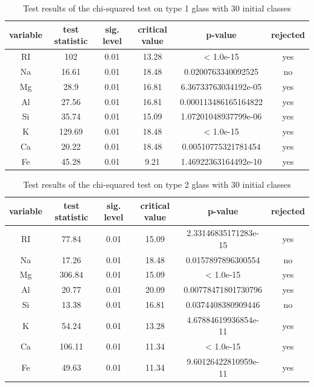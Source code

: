 \documentclass[a4paper, 12pt, titlepage, headsepline, listof = totoc, bibliography = totoc, numbers = noenddot]{scrartcl}
\begin{document}
\begin{appendix}
\begin{table}[h!]
\centering
\begin{tabular}{|cccccc|} \hline variable & test statistic & sig. level & critical value & p-value & rejected\\ \hline RI & 102 & 0.01 & 13.28 & < 1.0e-15 & yes\\ 
Na & 16.61 & 0.01 & 18.48 & 0.0200763340092525 & no\\ 
Mg & 28.9 & 0.01 & 16.81 & 6.36733763034192e-05 & yes\\ 
Al & 27.56 & 0.01 & 16.81 & 0.000113486165164822 & yes\\ 
Si & 35.74 & 0.01 & 15.09 & 1.07201048937799e-06 & yes\\ 
K & 129.69 & 0.01 & 18.48 & < 1.0e-15 & yes\\ 
Ca & 20.22 & 0.01 & 18.48 & 0.00510775321781454 & yes\\ 
Fe & 45.28 & 0.01 & 9.21 & 1.46922363164492e-10 & yes\\ \hline \end{tabular}\caption{Test results of the chi-squared test on type 1 glass with 30 initial classes}
\label{tab:chi-type1-30}
\end{table}

\begin{table}[h!]
\centering
\begin{tabular}{|cccccc|} \hline variable & test statistic & sig. level & critical value & p-value & rejected\\ \hline RI & 77.84 & 0.01 & 15.09 & 2.33146835171283e-15 & yes\\ 
Na & 17.26 & 0.01 & 18.48 & 0.0157897896300554 & no\\ 
Mg & 306.84 & 0.01 & 15.09 & < 1.0e-15 & yes\\ 
Al & 20.77 & 0.01 & 20.09 & 0.00778471801730796 & yes\\ 
Si & 13.38 & 0.01 & 16.81 & 0.0374408380909446 & no\\ 
K & 54.24 & 0.01 & 13.28 & 4.67884619936854e-11 & yes\\ 
Ca & 106.11 & 0.01 & 11.34 & < 1.0e-15 & yes\\ 
Fe & 49.63 & 0.01 & 11.34 & 9.60126422810959e-11 & yes\\ \hline \end{tabular}\caption{Test results of the chi-squared test on type 2 glass with 30 initial classes}
\label{tab:chi-type2-30}
\end{table}


\end{appendix}
\end{document}
